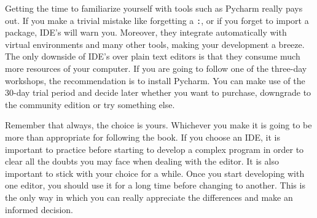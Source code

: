 Getting the time to familiarize yourself with tools such as Pycharm really pays out. If you make a trivial mistake like forgetting a \texttt{:}, or if you forget to import a package, IDE's will warn you. Moreover, they integrate automatically with virtual environments and many other tools, making your development a breeze. The only downside of IDE’s over plain text editors is that they consume much more resources of your computer. If you are going to follow one of the three-day workshops, the recommendation is to install Pycharm. You can make use of the 30-day trial period and decide later whether you want to purchase, downgrade to the community edition or try something else. 

Remember that always, the choice is yours. Whichever you make it is going to be more than appropriate for following the book. If you choose an IDE, it is important to practice before starting to develop a complex program in order to clear all the doubts you may face when dealing with the editor. It is also important to stick with your choice for a while. Once you start developing with one editor, you should use it for a long time before changing to another. This is the only way in which you can really appreciate the differences and make an informed decision. 

